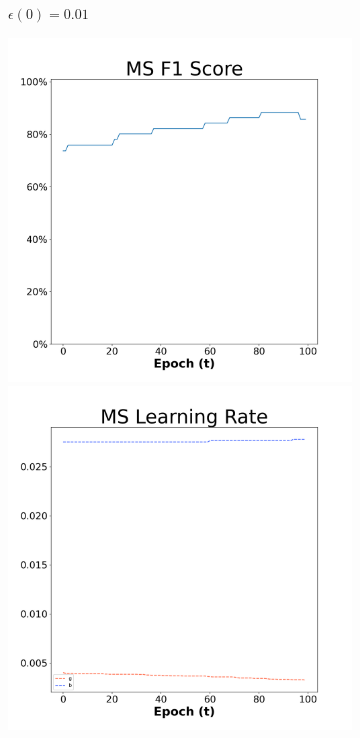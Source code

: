\begin{figure}[H]
\begin{subfigure}{0.3\textwidth}
  \caption{$\epsilon(0)=0.01$}
\end{subfigure}\hfil %
\begin{subfigure}{0.3\textwidth}
  \includegraphics[width=\linewidth]{images/exper2/Ionosphere/MS_0.03_f1.png}
  \includegraphics[width=\linewidth]{images/exper2/Ionosphere/MS_0.03_lr.png}

\end{subfigure}
\end{figure}

